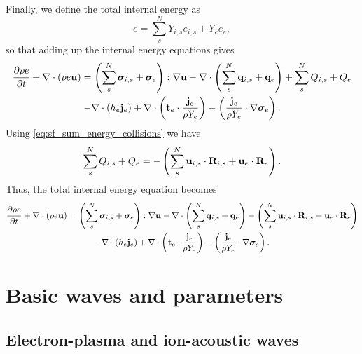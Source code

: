 \documentclass[a4paper,11pt]{report}
\begin{document}
Finally, we define the total internal energy as
\begin{equation}
    e = \sum_s^N Y_{i,s} e_{i,s} + Y_e e_e,
\end{equation}
so that adding up the internal energy equations gives
\begin{multline*}
    \frac{\partial \rho e}{\partial t} + \nabla \cdot \left( \rho e \mathbf{u} \right) = \left( \sum_s^N \bm \sigma_{i,s} + \bm \sigma_e \right): \nabla \mathbf{u} - \nabla \cdot \left( \sum_s^N \mathbf{q}_{i,s} + \mathbf{q}_e \right) + \sum_s^N Q_{i,s} + Q_e \\
    - \nabla \cdot \left( h_e \mathbf{j}_e \right) + \nabla \cdot \left( \mathbf{t}_e \cdot \frac{\mathbf{j}_e}{\rho Y_e} \right) - \left( \frac{\mathbf{j}_e}{\rho Y_e} \cdot \nabla \bm \sigma_e \right).
\end{multline*}
Using \cref{eq:sf_sum_energy_collisions} we have
\begin{equation}
    \sum_s^N Q_{i,s} + Q_e = - \left( \sum_s^N \mathbf{u}_{i,s} \cdot \mathbf{R}_{i,s} + \mathbf{u}_e \cdot \mathbf{R}_e \right).
\end{equation}
Thus, the total internal energy equation becomes
\begin{multline*}
    \frac{\partial \rho e}{\partial t} + \nabla \cdot \left( \rho e \mathbf{u} \right) = \left( \sum_s^N \bm \sigma_{i,s} + \bm \sigma_e \right): \nabla \mathbf{u} - \nabla \cdot \left( \sum_s^N \mathbf{q}_{i,s} + \mathbf{q}_e \right) - \left( \sum_s^N \mathbf{u}_{i,s} \cdot \mathbf{R}_{i,s} + \mathbf{u}_e \cdot \mathbf{R}_e \right) \\
    - \nabla \cdot \left( h_e \mathbf{j}_e \right) + \nabla \cdot \left( \mathbf{t}_e \cdot \frac{\mathbf{j}_e}{\rho Y_e} \right) - \left( \frac{\mathbf{j}_e}{\rho Y_e} \cdot \nabla \bm \sigma_e \right).
\end{multline*}

\chapter{Basic waves and parameters}

\section{Electron-plasma and ion-acoustic waves}
\end{document}
